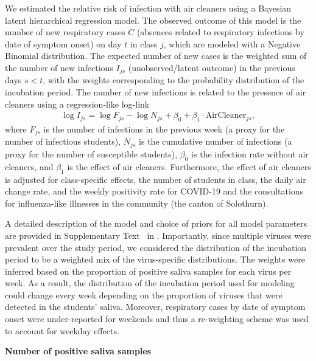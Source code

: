 \documentclass[fleqn,11pt]{wlscirep}
\begin{document}
\noindent We estimated the relative risk of infection with air cleaners using a Bayesian latent hierarchical regression model. The observed outcome of this model is the number of new respiratory cases $C$ (absences related to respiratory infections by date of symptom onset) on day $t$ in class $j$, which are modeled with a Negative Binomial distribution. The expected number of new cases is the weighted sum of the number of new infections $I_{js}$ (unobserved/latent outcome) in the previous days $s<t$, with the weights corresponding to the probability distribution of the incubation period. The number of new infections is related to the presence of air cleaners using a regression-like log-link
\begin{align}
    \log I_{js} = \log F_{js} - \log N_{js} + \beta_0 + \beta_1 \cdot \text{AirCleaner}_{js},
\end{align}
where $F_{js}$ is the number of infections in the previous week (a proxy for the number of infectious students), $N_{js}$ is the cumulative number of infections (a proxy for the number of susceptible students), $\beta_0$ is the infection rate without air cleaners, and $\beta_1$ is the effect of air cleaners. Furthermore, the effect of air cleaners is adjusted for class-specific effects, the number of students in class, the daily air change rate, and the weekly positivity rate for COVID-19 and the consultations for influenza-like illnesses in the community (\ie the canton of Solothurn).

A detailed description of the model and choice of priors for all model parameters are provided in Supplementary Text~ in \supp. Importantly, since multiple viruses were prevalent over the study period, we considered the distribution of the incubation period to be a weighted mix of the virus-specific distributions. The weights were inferred based on the proportion of positive saliva samples for each virus per week. As a result, the distribution of the incubation period used for modeling could change every week depending on the proportion of viruses that were detected in the students' saliva. Moreover, respiratory cases by date of symptom onset were under-reported for weekends and thus a re-weighting scheme was used to account for weekday effects. \medskip

\noindent\textbf{Number of positive saliva samples} \smallskip
\end{document}
